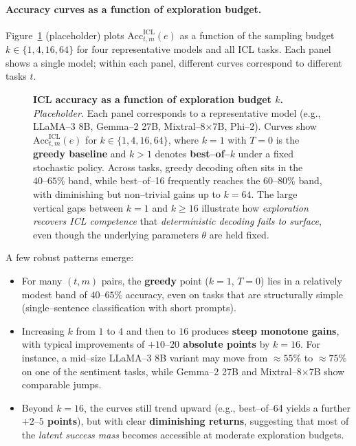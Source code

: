 \paragraph{\textbf{Accuracy curves as a function of exploration budget.}}
Figure~\ref{fig:icl-accuracy-vs-k} (placeholder) plots
$\mathrm{Acc}^{\text{ICL}}_{t,m}(e)$ as a function of the sampling
budget $k\in\{1,4,16,64\}$ for four representative models and all ICL
tasks. Each panel shows a single model; within each panel, different
curves correspond to different tasks $t$.

\begin{figure}[t]
  \centering
  \caption{\textbf{ICL accuracy as a function of exploration budget
  $k$.} \emph{Placeholder.} Each panel corresponds to a representative
  model (e.g., LLaMA--3 8B, Gemma--2 27B, Mixtral--8$\times$7B, Phi--2).
  Curves show $\mathrm{Acc}^{\text{ICL}}_{t,m}(e)$ for $k\in\{1,4,16,64\}$,
  where $k{=}1$ with $T{=}0$ is the \textbf{greedy baseline} and
  $k>1$ denotes \textbf{best--of--$k$} under a fixed stochastic policy.
  Across tasks, greedy decoding often sits in the
  \textbf{$40\text{--}65\%$} band, while best--of--16 frequently reaches
  the \textbf{$60\text{--}80\%$} band, with diminishing but non--trivial
  gains up to $k{=}64$. The large vertical gaps between $k{=}1$ and
  $k\ge 16$ illustrate how \emph{exploration recovers ICL competence}
  that \emph{deterministic decoding fails to surface}, even though the
  underlying parameters $\theta$ are held fixed.}
  \label{fig:icl-accuracy-vs-k}
\end{figure}

A few robust patterns emerge:

\begin{itemize}[leftmargin=1.5em]
  \item For many $(t,m)$ pairs, the \textbf{greedy} point ($k{=}1$,
        $T{=}0$) lies in a relatively modest band of
        \textbf{$40\text{--}65\%$} accuracy, even on tasks that are
        structurally simple (single--sentence classification with
        short prompts).
  \item Increasing $k$ from $1$ to $4$ and then to $16$ produces
        \textbf{steep monotone gains}, with typical improvements of
        \textbf{$+10\text{--}20$ absolute points} by $k{=}16$.
        For instance, a mid--size LLaMA--3 8B variant may move from
        $\approx 55\%$ to $\approx 75\%$ on one of the sentiment
        tasks, while Gemma--2 27B and Mixtral--8$\times$7B show
        comparable jumps.
  \item Beyond $k{=}16$, the curves still trend upward (e.g.,
        best--of--64 yields a further \textbf{$+2\text{--}5$ points}),
        but with clear \textbf{diminishing returns}, suggesting that
        most of the \emph{latent success mass} becomes accessible at
        moderate exploration budgets.
\end{itemize}

